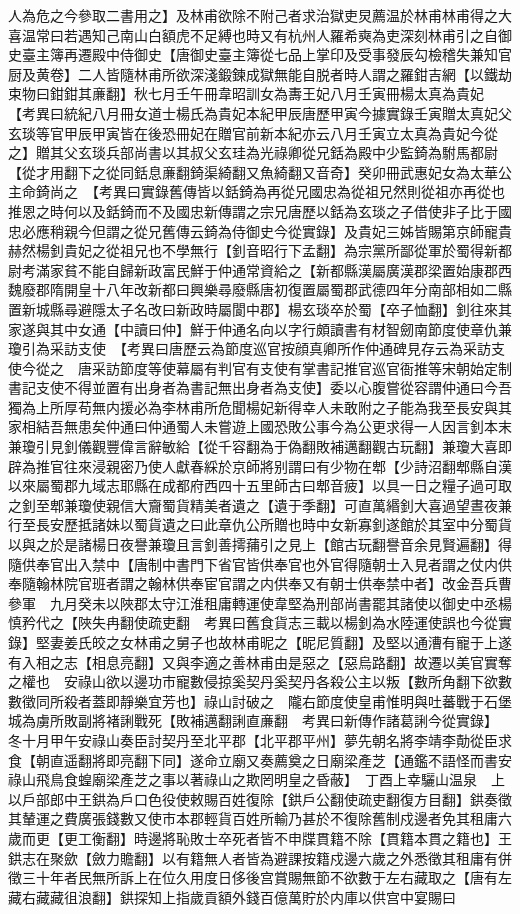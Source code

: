人為危之今參取二書用之】及林甫欲除不附己者求治獄吏炅薦温於林甫林甫得之大喜温常曰若遇知己南山白額虎不足縛也時又有杭州人羅希奭為吏深刻林甫引之自御史臺主簿再遷殿中侍御史【唐御史臺主簿從七品上掌印及受事發辰勾檢稽失兼知官厨及黄卷】二人皆隨林甫所欲深淺鍛鍊成獄無能自脱者時人謂之羅鉗吉網【以鐵劫束物曰鉗鉗其亷翻】秋七月壬午冊韋昭訓女為夀王妃八月壬寅冊楊太真為貴妃　【考異曰統紀八月冊女道士楊氏為貴妃本紀甲辰唐歷甲寅今據實錄壬寅贈太真妃父玄琰等官甲辰甲寅皆在後恐冊妃在贈官前新本紀亦云八月壬寅立太真為貴妃今從之】贈其父玄琰兵部尚書以其叔父玄珪為光祿卿從兄銛為殿中少監錡為駙馬都尉【從才用翻下之從同銛息亷翻錡渠綺翻又魚綺翻又音奇】癸卯冊武惠妃女為太華公主命錡尚之　【考異曰實錄舊傳皆以銛錡為再從兄國忠為從祖兄然則從祖亦再從也推恩之時何以及銛錡而不及國忠新傳謂之宗兄唐歷以銛為玄琰之子借使非子比于國忠必應稍親今但謂之從兄舊傳云錡為侍御史今從實錄】及貴妃三姊皆賜第京師寵貴赫然楊釗貴妃之從祖兄也不學無行【釗音昭行下孟翻】為宗黨所鄙從軍於蜀得新都尉考滿家貧不能自歸新政富民鮮于仲通常資給之【新都縣漢屬廣漢郡梁置始康郡西魏廢郡隋開皇十八年改新都曰興樂尋廢縣唐初復置屬蜀郡武德四年分南部相如二縣置新城縣尋避隱太子名改曰新政時屬閬中郡】楊玄琰卒於蜀【卒子恤翻】釗往來其家遂與其中女通【中讀曰仲】鮮于仲通名向以字行頗讀書有材智劒南節度使章仇兼瓊引為采訪支使　【考異曰唐歷云為節度巡官按顔真卿所作仲通碑見存云為采訪支使今從之　唐采訪節度等使幕屬有判官有支使有掌書記推官巡官衙推等宋朝始定制書記支使不得並置有出身者為書記無出身者為支使】委以心腹嘗從容謂仲通曰今吾獨為上所厚苟無内援必為李林甫所危聞楊妃新得幸人未敢附之子能為我至長安與其家相結吾無患矣仲通曰仲通蜀人未嘗遊上國恐敗公事今為公更求得一人因言釗本末兼瓊引見釗儀觀豐偉言辭敏給【從千容翻為于偽翻敗補邁翻觀古玩翻】兼瓊大喜即辟為推官往來浸親密乃使人獻春綵於京師將别謂曰有少物在郫【少詩沼翻郫縣自漢以來屬蜀郡九域志耶縣在成都府西四十五里師古曰郫音疲】以具一日之糧子過可取之釗至郫兼瓊使親信大齎蜀貨精美者遺之【遺于季翻】可直萬緡釗大喜過望晝夜兼行至長安歷抵諸妹以蜀貨遺之曰此章仇公所贈也時中女新寡釗遂館於其室中分蜀貨以與之於是諸楊日夜譽兼瓊且言釗善摴蒱引之見上【館古玩翻譽音余見賢遍翻】得隨供奉官出入禁中【唐制中書門下省官皆供奉官也外官得隨朝士入見者謂之仗内供奉隨翰林院官班者謂之翰林供奉宦官謂之内供奉又有朝士供奉禁中者】改金吾兵曹參軍　九月癸未以陜郡太守江淮租庸轉運使韋堅為刑部尚書罷其諸使以御史中丞楊慎矜代之【陜失冉翻使疏吏翻　考異曰舊食貨志三載以楊釗為水陸運使誤也今從實錄】堅妻姜氏皎之女林甫之舅子也故林甫昵之【昵尼質翻】及堅以通漕有寵于上遂有入相之志【相息亮翻】又與李適之善林甫由是惡之【惡烏路翻】故遷以美官實奪之權也　安祿山欲以邊功市寵數侵掠奚契丹奚契丹各殺公主以叛【數所角翻下欲數數徵同所殺者蓋即靜樂宜芳也】祿山討破之　隴右節度使皇甫惟明與吐蕃戰于石堡城為虜所敗副將褚誗戰死【敗補邁翻誗直亷翻　考異曰新傳作諸葛誗今從實錄】　冬十月甲午安祿山奏臣討契丹至北平郡【北平郡平州】夢先朝名將李靖李勣從臣求食【朝直遥翻將即亮翻下同】遂命立廟又奏薦奠之日廟梁產芝【通鑑不語怪而書安祿山飛鳥食蝗廟梁產芝之事以著祿山之欺罔明皇之昏蔽】　丁酉上幸驪山温泉　上以戶部郎中王鉷為戶口色役使敕賜百姓復除【鉷戶公翻使疏吏翻復方目翻】鉷奏徵其輦運之費廣張錢數又使市本郡輕貨百姓所輸乃甚於不復除舊制戍邊者免其租庸六歲而更【更工衡翻】時邊將恥敗士卒死者皆不申牒貫籍不除【貫籍本貫之籍也】王鉷志在聚歛【斂力贍翻】以有籍無人者皆為避課按籍戍邊六歲之外悉徵其租庸有併徵三十年者民無所訴上在位久用度日侈後宫賞賜無節不欲數于左右藏取之【唐有左藏右藏藏徂浪翻】鉷探知上指歲貢額外錢百億萬貯於内庫以供宫中宴賜曰